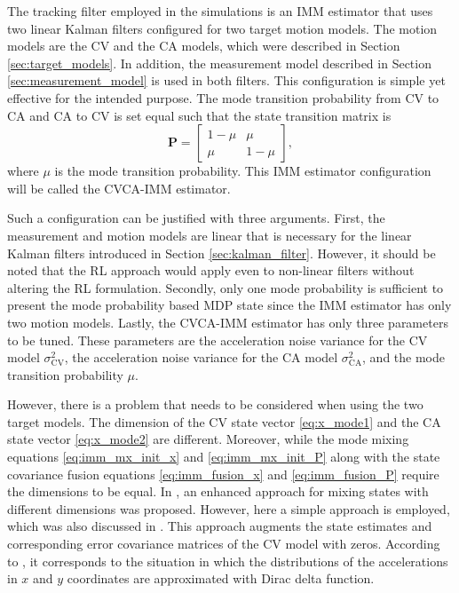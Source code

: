 \documentclass[english, 12pt, a4paper, elec, utf8, a-1b, online]{aaltothesis}
\numberwithin{equation}{section}
\newcommand{\varcv}{\sigma_\text{CV}^2}
\newcommand{\varca}{\sigma_\text{CA}^2}
\newcommand{\msp}{\mu}
\renewcommand{\vec}[1]{\mathbf{#1}}
\begin{document}
The tracking filter employed in the simulations is an IMM estimator that uses two linear Kalman filters configured for two target motion models.
The motion models are the CV and the CA models, which were described in Section \ref{sec:target_models}.
In addition, the measurement model described in Section \ref{sec:measurement_model} is used in both filters.
This configuration is simple yet effective for the intended purpose.
The mode transition probability from CV to CA and CA to CV is set equal such that the state transition matrix is
\begin{equation}
    \vec{P} = 
\begin{bmatrix}
1 - \msp & \msp\\ 
\msp & 1 - \msp
\end{bmatrix},
\end{equation}
where $\msp$ is the mode transition probability.
This IMM estimator configuration will be called the CVCA-IMM estimator.

Such a configuration can be justified with three arguments.
First, the measurement and motion models are linear that is necessary for the linear Kalman filters introduced in Section \ref{sec:kalman_filter}.
However, it should be noted that the RL approach would apply even to non-linear filters without altering the RL formulation.
Secondly, only one mode probability is sufficient to present the mode probability based MDP state since the IMM estimator has only two motion models.
Lastly, the CVCA-IMM estimator has only three parameters to be tuned.
These parameters are the acceleration noise variance for the CV model $\varcv$, the acceleration noise variance for the CA model $\varca$, and the mode transition probability $\msp$.

However, there is a problem that needs to be considered when using the two target models.
The dimension of the CV state vector \eqref{eq:x_mode1} and the CA state vector \eqref{eq:x_mode2} are different. 
Moreover, while the mode mixing equations \eqref{eq:imm_mx_init_x} and \eqref{eq:imm_mx_init_P} along with the state covariance fusion equations \eqref{eq:imm_fusion_x} and \eqref{eq:imm_fusion_P} require the dimensions to be equal.
In \cite{Granstroem2015}, an enhanced approach for mixing states with different dimensions was proposed.
However, here a simple approach is employed, which was also discussed in \cite{Granstroem2015}.
This approach augments the state estimates and corresponding error covariance matrices of the CV model with zeros.
According to \cite{Granstroem2015}, it corresponds to the situation in which the distributions of the accelerations in $x$ and $y$ coordinates are approximated with Dirac delta function.
\end{document}
